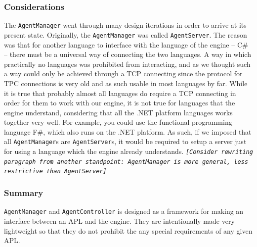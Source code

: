\subsubsection*{Considerations}

The \texttt{AgentManager} went through many design iterations in order
to arrive at its present state. Originally, the \texttt{AgentManager}
was called \texttt{AgentServer}. The reason was that for another language
to interface with the language of the engine -- C\# -- there must
be a universal way of connecting the two languages. A way in which
practically no languages was prohibited from interacting, and as we
thought such a way could only be achieved through a TCP connecting
since the protocol for TPC connections is very old and as such usable
in most languages by far. While it is true that probably almost all
languages do require a TCP connecting in order for them to work with
our engine, it is not true for languages that the engine understand,
considering that all the .NET platform languages works together very
well. For example, you could use the functional programming language
F\#, which also runs on the .NET platform. As such, if we imposed
that all \texttt{AgentManager}s are \texttt{AgentServer}s, it would
be required to setup a server just for using a language which the
engine already understands. \texttt{\emph{{[}Consider rewriting paragraph
from another standpoint: AgentManager is more general, less restrictive
than AgentServer{]}}}


\subsubsection*{Summary}

\texttt{AgentManager} and \texttt{AgentController} is designed as
a framework for making an interface between an APL and the engine.
They are intentionally made very lightweight so that they do not prohibit
the any special requirements of any given APL.
